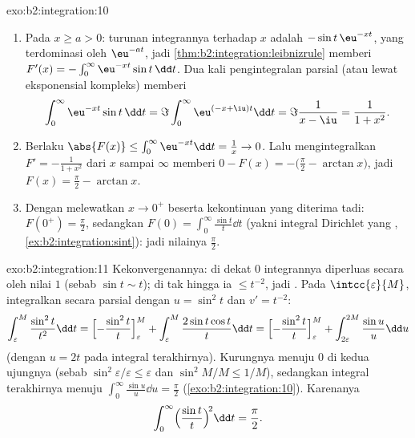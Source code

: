 \begin{solution}{exo:b2:integration:10}
\begin{enumerate}
  \item Pada $x \geq a > 0$: turunan integrannya terhadap $x$ adalah
        $-\sin t\,\eu^{-xt}$, yang terdominasi oleh $\eu^{-at}$, jadi
        \cref{thm:b2:integration:leibnizrule} memberi $F'(x) =
        -\int_0^\infty \eu^{-xt}\sin t\,\dd t$. Dua kali pengintegralan
        parsial (atau lewat eksponensial kompleks) memberi
        \[
        \int_0^\infty \eu^{-xt}\sin t\,\dd t
        = \Im \int_0^\infty \eu^{(-x+\iu)t}\dd t
        = \Im\frac{1}{x - \iu} = \frac{1}{1 + x^2} .
        \]
  \item Berlaku $\abs{F(x)} \leq \int_0^\infty \eu^{-xt}\dd t = \frac1x
        \to 0$. Lalu mengintegralkan $F' = -\frac{1}{1+x^2}$ dari $x$
        sampai $\infty$ memberi $0 - F(x) = -\bigl(\frac\pi2 - \arctan
        x\bigr)$, jadi $F(x) = \frac\pi2 - \arctan x$.
  \item Dengan melewatkan $x \to 0^+$ beserta kekontinuan yang diterima
        tadi: $F(0^+) = \frac\pi2$, sedangkan $F(0) = \int_0^\infty
        \frac{\sin t}{t}\dd t$ (yakni integral Dirichlet yang
        , \cref{ex:b2:integration:sint}): jadi nilainya
        $\frac\pi2$.
\end{enumerate}
\end{solution}

\begin{solution}{exo:b2:integration:11}
Kekonvergenannya: di dekat $0$ integrannya diperluas secara  oleh
nilai $1$ (sebab $\sin t \sim t$); di tak hingga ia $\leq t^{-2}$, jadi
 . Pada $\intcc{\varepsilon}{M}$, integralkan secara
parsial dengan $u = \sin^2 t$ dan $v' = t^{-2}$:
\[
\int_\varepsilon^M \frac{\sin^2 t}{t^2}\dd t
= \Bigl[-\frac{\sin^2 t}{t}\Bigr]_\varepsilon^M
+ \int_\varepsilon^M \frac{2\sin t\cos t}{t}\dd t
= \Bigl[-\frac{\sin^2 t}{t}\Bigr]_\varepsilon^M
+ \int_{2\varepsilon}^{2M} \frac{\sin u}{u}\dd u
\]
(dengan $u = 2t$ pada integral terakhirnya). Kurungnya menuju $0$ di
kedua ujungnya (sebab $\sin^2\varepsilon/\varepsilon \leq \varepsilon$
dan $\sin^2 M/M \leq 1/M$), sedangkan integral terakhirnya menuju
$\int_0^\infty \frac{\sin u}{u}\dd u = \frac\pi2$
(\cref{exo:b2:integration:10}). Karenanya
\[
\int_0^\infty \Bigl(\frac{\sin t}{t}\Bigr)^{\!2}\dd t
= \frac\pi2 .
\]
\end{solution}

